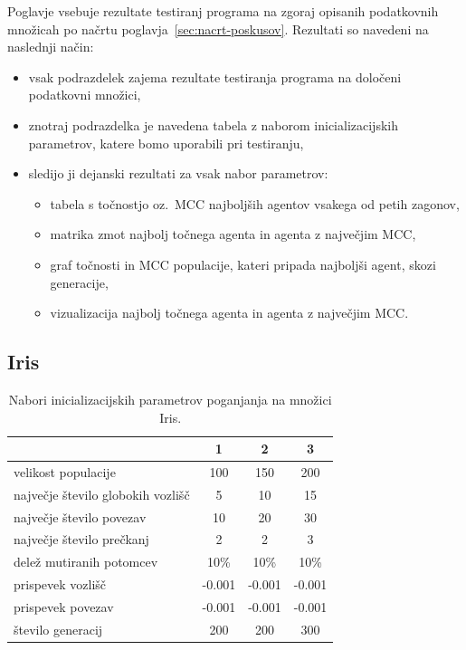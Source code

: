 Poglavje vsebuje rezultate testiranj programa na zgoraj opisanih podatkovnih množicah po načrtu poglavja~\ref{sec:nacrt-poskusov}.
Rezultati so navedeni na naslednji način:
\begin{itemize}
    \item vsak podrazdelek zajema rezultate testiranja programa na določeni podatkovni množici,
    \item znotraj podrazdelka je navedena tabela z naborom inicializacijskih parametrov, katere bomo uporabili pri testiranju,
    \item sledijo ji dejanski rezultati za vsak nabor parametrov:
    \begin{itemize}
        \item tabela s točnostjo oz.\ MCC najboljših agentov vsakega od petih zagonov,
        \item matrika zmot najbolj točnega agenta in agenta z največjim MCC,
        \item graf točnosti in MCC populacije, kateri pripada najboljši agent, skozi generacije,
        \item vizualizacija najbolj točnega agenta in agenta z največjim MCC.
    \end{itemize}
\end{itemize}

\subsection{Iris}\label{subsec:iris_test}
\begin{table}[H]
    \caption{Nabori inicializacijskih parametrov poganjanja na množici Iris.}
    \begin{center}
        \begin{tabular}{||l c c c||}
            \hline
            & 1      & 2      & 3 \\ [0.5ex]
            \hline
            velikost populacije               & 100    & 150    & 200    \\
            \hline
            največje število globokih vozlišč & 5      & 10     & 15     \\
            \hline
            največje število povezav          & 10     & 20     & 30     \\
            \hline
            največje število prečkanj         & 2      & 2      & 3      \\
            \hline
            delež mutiranih potomcev          & 10\%   & 10\%   & 10\%   \\
            \hline
            prispevek vozlišč                 & -0.001 & -0.001 & -0.001 \\
            \hline
            prispevek povezav                 & -0.001 & -0.001 & -0.001 \\
            \hline
            število generacij                 & 200    & 200    & 300    \\
            \hline
        \end{tabular}
    \end{center}
    \label{tab:param_iris}
\end{table}

